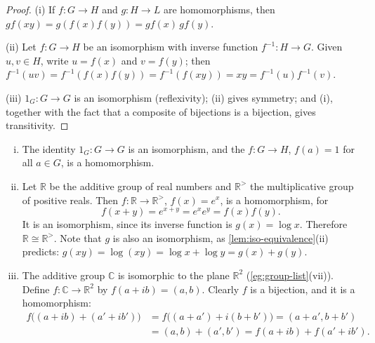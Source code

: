 \begin{proof}
	(i) If \(f\colon G \to H\) and \(g\colon H \to L\) are homomorphisms, then
	\(gf(xy) = g(f(x)f(y)) = gf(x)\,gf(y)\).

	(ii) Let \(f\colon G \to H\) be an isomorphism with inverse function
	\(f^{-1}\colon H \to G\). Given \(u, v \in H\), write \(u = f(x)\) and \(v = f(y)\);
	then \(f^{-1}(uv) = f^{-1}(f(x)f(y)) = f^{-1}(f(xy)) = xy = f^{-1}(u)f^{-1}(v)\).

	(iii) \(1_G\colon G \to G\) is an isomorphism (reflexivity); (ii) gives symmetry; and
	(i), together with the fact that a composite of bijections is a bijection, gives
	transitivity.
\end{proof}

\begin{eg}\label{eg:hom-first}
	\begin{enumerate}[(i)]
		\item The identity \(1_G\colon G \to G\) is an isomorphism, and the  \(f\colon G \to H\), \(f(a) = 1\) for all \(a \in G\), is a
		      homomorphism.
		\item Let \(\mathbb R\) be the additive group of real numbers and
		      \(\mathbb R^{>}\) the multiplicative group of positive reals. Then
		      \(f\colon \mathbb R \to \mathbb R^{>}\), \(f(x) = e^x\), is a homomorphism,
		      for
		      \[
			      f(x+y) = e^{x+y} = e^xe^y = f(x)f(y).
		      \]
		      It is an isomorphism, since its inverse function is
		      \(g(x) = \log x\). Therefore \(\mathbb R \cong \mathbb R^{>}\). Note that
		      \(g\) is also an isomorphism, as \autoref{lem:iso-equivalence}(ii) predicts:
		      \(g(xy) = \log(xy) = \log x + \log y = g(x) + g(y)\).
		\item The additive group \(\mathbb C\) is isomorphic to the plane
		      \(\mathbb R^2\) (\autoref{eg:group-list}(vii)). Define
		      \(f\colon \mathbb C \to \mathbb R^2\) by \(f(a + ib) = (a,b)\). Clearly \(f\)
		      is a bijection, and it is a homomorphism:
		      \begin{align*}
			      f\bigl((a+ib) + (a'+ib')\bigr)
			       & = f\bigl((a+a') + i(b+b')\bigr) = (a+a', b+b') \\
			       & = (a,b) + (a',b') = f(a+ib) + f(a'+ib').
		      \end{align*}
	\end{enumerate}
\end{eg}

